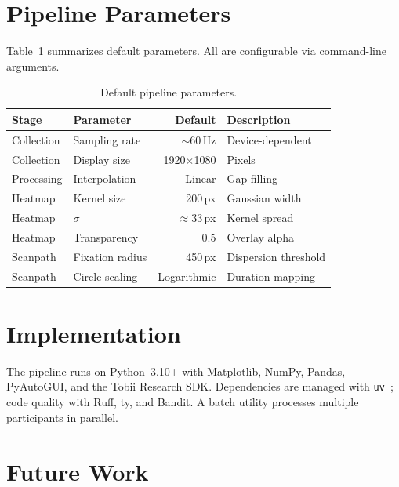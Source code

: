 \documentclass[11pt,a4paper]{article}
\begin{document}
\section{Pipeline Parameters}
\label{sec:parameters}

Table~\ref{tab:params} summarizes default parameters. All are
configurable via command-line arguments.

\begin{table}[ht]
  \centering
  \caption{Default pipeline parameters.}
  \label{tab:params}
  \begin{tabular}{@{}llrl@{}}
    \toprule
    \textbf{Stage} & \textbf{Parameter} & \textbf{Default} & \textbf{Description} \\
    \midrule
    Collection & Sampling rate       & $\sim$60\,Hz       & Device-dependent \\
    Collection & Display size        & 1920$\times$1080   & Pixels \\
    Processing & Interpolation       & Linear             & Gap filling \\
    Heatmap    & Kernel size         & 200\,px            & Gaussian width \\
    Heatmap    & $\sigma$            & $\approx$33\,px    & Kernel spread \\
    Heatmap    & Transparency        & 0.5                & Overlay alpha \\
    Scanpath   & Fixation radius     & 450\,px            & Dispersion threshold \\
    Scanpath   & Circle scaling      & Logarithmic        & Duration mapping \\
    \bottomrule
  \end{tabular}
\end{table}

\section{Implementation}
\label{sec:implementation}

The pipeline runs on Python~3.10+ with Matplotlib, NumPy, Pandas,
PyAutoGUI, and the Tobii Research SDK. Dependencies are managed with
\texttt{uv}~\citep{uv2024}; code quality with Ruff, ty, and Bandit.
A batch utility processes multiple participants in parallel.

\section{Future Work}
\label{sec:future}
\end{document}
